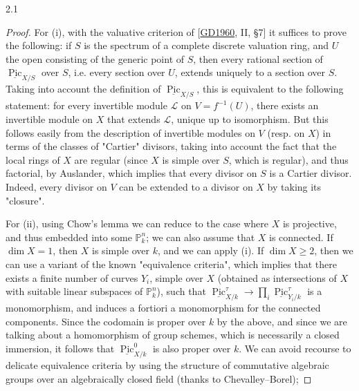 \begin{theorem}{2.1}
\begin{enumerate}
  \end{enumerate}\begin{proof}\par{}For (i), with the valuative criterion of [\hyperref[GD1960]{GD1960}, II, §7] it suffices to prove the following: if \(S\) is the spectrum of a complete discrete valuation ring, and \(U\) the open consisting of the generic point of \(S\), then every rational section of \(\underline {\operatorname {Pic}}_{X/S}\) over \(S\), i.e. every section over \(U\), extends uniquely to a section over \(S\).
      Taking into account the definition of \(\underline {\operatorname {Pic}}_{X/S}\), this is equivalent to the following statement: for every invertible module \(\mathscr {L}\) on \(V=f^{-1}(U)\), there exists an invertible module on \(X\) that extends \(\mathscr {L}\), unique up to isomorphism.
      But this follows easily from the description of invertible modules on \(V\) (resp. on \(X\)) in terms of the classes of "Cartier" divisors, taking into account the fact that the local rings of \(X\) are regular (since \(X\) is simple over \(S\), which is regular), and thus factorial, by Auslander, which implies that every divisor on \(S\) is a Cartier divisor.
      Indeed, every divisor on \(V\) can be extended to a divisor on \(X\) by taking its "closure".\par{}For (ii), using Chow's lemma we can reduce to the case where \(X\) is projective, and thus embedded into some \(\mathbb {P}_k^n\);
      we can also assume that \(X\) is connected.
      If \(\dim  X=1\), then \(X\) is simple over \(k\), and we can apply (i).
      If \(\dim  X\geqslant 2\), then we can use a variant of the known "equivalence criteria", which implies that there exists a finite number of curves \(Y_i\), simple over \(X\) (obtained as intersections of \(X\) with suitable linear subspaces of \(\mathbb {P}_k^n\)), such that \(\underline {\operatorname {Pic}}_{X/k}^\tau \to \prod _i\underline {\operatorname {Pic}}_{Y_i/k}^\tau \) is a monomorphism, and induces a fortiori a monomorphism for the connected components.
      Since the codomain is proper over \(k\) by the above, and since we are talking about a homomorphism of group schemes, which is necessarily a closed immersion, it follows that \(\underline {\operatorname {Pic}}_{X/k}^0\) is also proper over \(k\).
      We can avoid recourse to delicate equivalence criteria by using the structure of commutative algebraic groups over an algebraically closed field (thanks to Chevalley–Borel);

\end{proof}
\end{theorem}
